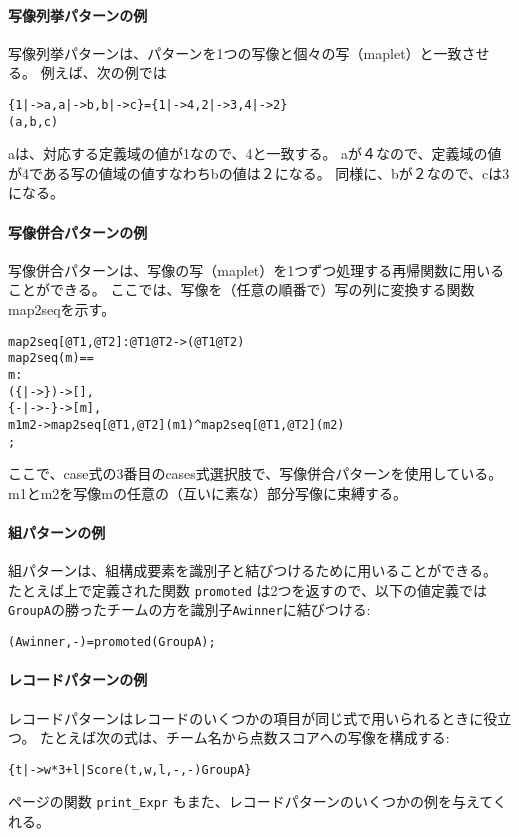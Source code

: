 \documentclass[\pformat,12pt]{jarticle}
\begin{document}
\begin{description}
\paragraph{写像列挙パターンの例}
写像列挙パターンは、パターンを1つの写像と個々の写（maplet）と一致させる。
例えば、次の例では

\begin{alltt}
  \{1 |-> a, a |-> b, b |-> c\} = \{1 |-> 4, 2 |-> 3, 4 |-> 2\} 
  (a, b, c)
\end{alltt}
aは、対応する定義域の値が1なので、4と一致する。
aが４なので、定義域の値が4である写の値域の値すなわちbの値は２になる。
同様に、bが２なので、cは3になる。

\paragraph{写像併合パターンの例}
写像併合パターンは、写像の写（maplet）を1つずつ処理する再帰関数に用いることができる。
ここでは、写像を（任意の順番で）写の列に変換する関数map2seqを示す。

\begin{alltt}
map2seq[@T1, @T2] :  @T1  @T2 ->  ( @T1  @T2)
map2seq(m) ==
   m:
    (\{|->\})	-> [],
    \{- |-> -\}	-> [m],
    m1  m2 -> map2seq[@T1, @T2] (m1) ^  map2seq[@T1, @T2] (m2)
  ;
\end{alltt}

ここで、case式の3番目のcases式選択肢で、写像併合パターンを使用している。
m1とm2を写像mの任意の（互いに素な）部分写像に束縛する。

\paragraph{組パターンの例}
組パターンは、組構成要素を識別子と結びつけるために用いることができる。
たとえば上で定義された関数 \texttt{promoted} は2つを返すので、以下の値定義では \texttt{GroupA}の勝ったチームの方を識別子\texttt{Awinner}に結びつける:
\begin{alltt}

    (Awinner,-) = promoted(GroupA);
\end{alltt}

\paragraph{レコードパターンの例}
レコードパターンはレコードのいくつかの項目が同じ式で用いられるときに役立つ。
たとえば次の式は、チーム名から点数スコアへの写像を構成する:
\begin{alltt}
  \{ t |-> w * 3 + l | Score(t,w,l,-,-)  GroupA\}
\end{alltt}
 \pageref{printExprDef}ページの関数 \texttt{print\_Expr} もまた、レコードパターンのいくつかの例を与えてくれる。


\end{description}
\end{document}
